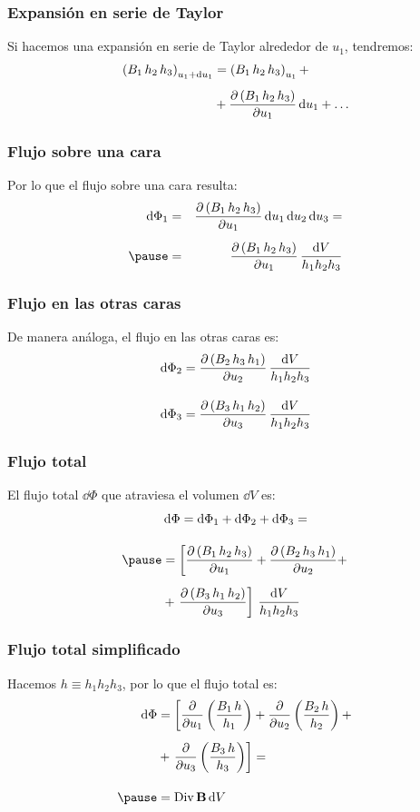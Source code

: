 \documentclass[12pt]{beamer}
\begin{document}
\begin{frame}
\frametitle{Expansión en serie de Taylor}
Si hacemos una expansión en serie de Taylor alrededor de $u_{1}$, tendremos:
\pause
\begin{align*}
\left( B_{1} \, h_{2} \, h_{3} \right)_{u_{1} + \dd{u_{1}}} &= \left( B_{1} \, h_{2} \, h_{3} \right)_{u_{1}} + \\[0.5em]
&+ \pdv{\left( B_{1} \, h_{2} \, h_{3} \right)}{u_{1}} \dd{u_{1}} + \ldots
\end{align*}
\end{frame}
\begin{frame}
\frametitle{Flujo sobre una cara}
Por lo que el flujo sobre una cara resulta:
\pause
\begin{eqnarray*}
\dd{\Phi_{1}} &=& \pdv{\left( B_{1} \, h_{2} \, h_{3} \right)}{u_{1}} \dd{u_{1}} \dd{u_{2}} \dd{u_{3}} = \\[0.5em] \pause
&=& \pdv{\left( B_{1} \, h_{2} \, h_{3} \right)}{u_{1}} \, \dfrac{\dd{V}}{h_{1} h_{2} h_{3}}
\end{eqnarray*}
\end{frame}
\begin{frame}
\frametitle{Flujo en las otras caras}
De manera análoga, el flujo en las otras caras es:
\pause
\begin{align*}
\dd{\Phi_{2}} &= \pdv{\left( B_{2} \, h_{3} \, h_{1} \right)}{u_{2}} \, \dfrac{\dd{V}}{h_{1} h_{2} h_{3}} \\[1em]
\dd{\Phi_{3}} &= \pdv{\left( B_{3} \, h_{1} \, h_{2} \right)}{u_{3}} \, \dfrac{\dd{V}}{h_{1} h_{2} h_{3}}
\end{align*}
\end{frame}
\begin{frame}
\frametitle{Flujo total}
El flujo total $\dd{\Phi}$ que atraviesa el volumen $\dd{V}$ es:
\pause
\begin{eqnarray*}
&\dd{\Phi} = \dd{\Phi_{1}} + \dd{\Phi_{2}} + \dd{\Phi_{3}} = \\[1em] \pause
&= \left[ \displaystyle \pdv{\left( B_{1} \, h_{2} \, h_{3} \right)}{u_{1}} + \pdv{\left( B_{2} \, h_{3} \, h_{1} \right)}{u_{2}} + \right. \\[0.5em] 
&+ \left. \displaystyle \pdv{\left( B_{3} \, h_{1} \, h_{2} \right)}{u_{3}} \right] \, \dfrac{\dd{V}}{h_{1} h_{2} h_{3}}
\end{eqnarray*}
\end{frame}
\begin{frame}
\frametitle{Flujo total simplificado}
Hacemos $h \equiv h_{1} h_{2} h_{3}$, por lo que el flujo total es:
\pause
\begin{eqnarray*}
\begin{aligned}
\dd{\Phi} &= \left[ \displaystyle \pdv{u_{1}} \left( \dfrac{B_{1} \, h}{h_{1}} \right) + \pdv{u_{2}} \left( \dfrac{B_{2} \, h}{h_{2}} \right) + \right. \\[0.5em]
&+ \left. \displaystyle \pdv{u_{3}} \left( \dfrac{B_{3} \, h}{h_{3}} \right) \right] = \\[1em] \pause
&= {\rm Div} \, \vb{B} \dd{V}
\end{aligned}
\end{eqnarray*}
\end{frame}
\end{document}
